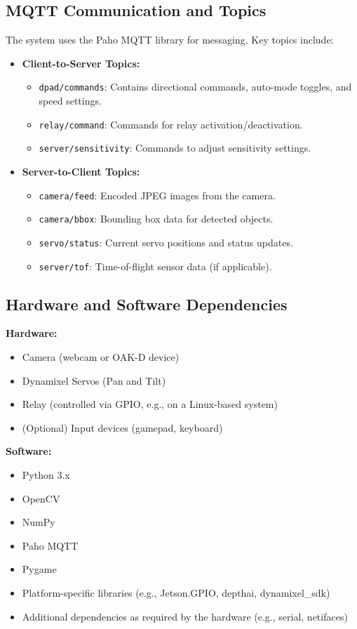 \documentclass[12pt]{article}
\begin{document}
\subsection{MQTT Communication and Topics}
The system uses the Paho MQTT library for messaging. Key topics include:
\begin{itemize}[leftmargin=*, label={--}]
    \item \textbf{Client-to-Server Topics:}
        \begin{itemize}[leftmargin=*, label={*}]
            \item \texttt{dpad/commands}: Contains directional commands, auto-mode toggles, and speed settings.
            \item \texttt{relay/command}: Commands for relay activation/deactivation.
            \item \texttt{server/sensitivity}: Commands to adjust sensitivity settings.
        \end{itemize}
    \item \textbf{Server-to-Client Topics:}
        \begin{itemize}[leftmargin=*, label={*}]
            \item \texttt{camera/feed}: Encoded JPEG images from the camera.
            \item \texttt{camera/bbox}: Bounding box data for detected objects.
            \item \texttt{servo/status}: Current servo positions and status updates.
            \item \texttt{server/tof}: Time-of-flight sensor data (if applicable).
        \end{itemize}
\end{itemize}

\subsection{Hardware and Software Dependencies}
\textbf{Hardware:}
\begin{itemize}[leftmargin=*, label={--}]
    \item Camera (webcam or OAK-D device)
    \item Dynamixel Servos (Pan and Tilt)
    \item Relay (controlled via GPIO, e.g., on a Linux-based system)
    \item (Optional) Input devices (gamepad, keyboard)
\end{itemize}

\textbf{Software:}
\begin{itemize}[leftmargin=*, label={--}]
    \item Python 3.x
    \item OpenCV
    \item NumPy
    \item Paho MQTT
    \item Pygame
    \item Platform-specific libraries (e.g., Jetson.GPIO, depthai, dynamixel\_sdk)
    \item Additional dependencies as required by the hardware (e.g., serial, netifaces)
\end{itemize}
\end{document}
